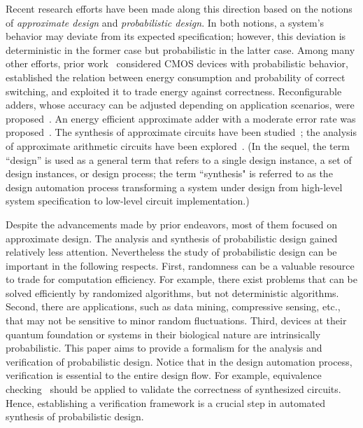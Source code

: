     Recent research efforts have been made along this direction based
    on the notions of \textit{approximate design} and \textit{probabilistic design}.
    In both notions, a system's behavior may deviate from its expected specification;
    however, this deviation is deterministic in the former case but probabilistic in the latter case.
    Among many other efforts, prior work~\cite{Chakrapani2006ProbDesign} considered CMOS devices with probabilistic behavior, established the relation between energy consumption and probability of correct switching, and exploited it to trade energy against correctness.
    Reconfigurable adders, whose accuracy can be adjusted depending on application scenarios, were proposed~\cite{Kahng2012,Ye2013}.
    An energy efficient approximate adder with a moderate error rate was proposed~\cite{Kim2013}.
    The synthesis of approximate circuits have been studied~\cite{Venkatesan2011ApproxDesign,Venkataramani2012,Miao2013,Miao2014};
    the analysis of approximate arithmetic circuits have been explored~\cite{Li2014,Mrazek2016,Rehman2016}.
    (In the sequel, the term ``design'' is used as a general term that refers to a single design instance, a set of design instances, or design process;
    the term ``synthesis" is referred to as the design automation process transforming a system under design from high-level system specification to low-level circuit implementation.)

    Despite the advancements made by prior endeavors, most of them focused on approximate design.
    The analysis and synthesis of probabilistic design gained relatively less attention.
    Nevertheless the study of probabilistic design can be important in the following respects.
    First, randomness can be a valuable resource to trade for computation efficiency.
    For example, there exist problems that can be solved efficiently by randomized algorithms, but not deterministic algorithms.
    Second, there are applications, such as data mining, compressive sensing, etc., that may not be
    sensitive to minor random fluctuations.
    Third, devices at their quantum foundation or systems in their biological nature are intrinsically probabilistic.
    This paper aims to provide a formalism for the analysis and verification of probabilistic design.
    Notice that in the design automation process, verification is essential to the entire design flow.
    For example, equivalence checking~\cite{Kuehlmann1997,Mishchenko2006} should be applied to validate the correctness of synthesized circuits.
    Hence, establishing a verification framework is a crucial step in automated synthesis of probabilistic design.


